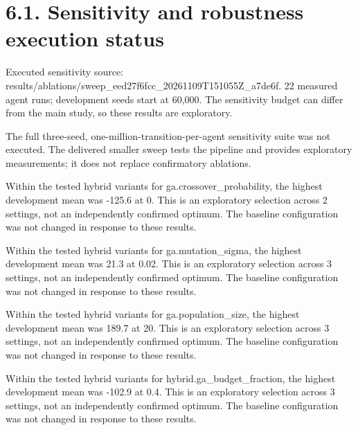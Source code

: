 \documentclass[11pt,a4paper]{article}
\begin{document}
\section*{6.1. Sensitivity and robustness execution status}
Executed sensitivity source: results/ablations/sweep\_eed27f6fcc\_20261109T151055Z\_a7de6f. 22 measured agent runs; development seeds start at 60,000. The sensitivity budget can differ from the main study, so these results are exploratory.

The full three-seed, one-million-transition-per-agent sensitivity suite was not executed. The delivered smaller sweep tests the pipeline and provides exploratory measurements; it does not replace confirmatory ablations.

Within the tested hybrid variants for ga.crossover\_probability, the highest development mean was -125.6 at 0. This is an exploratory selection across 2 settings, not an independently confirmed optimum. The baseline configuration was not changed in response to these results.

Within the tested hybrid variants for ga.mutation\_sigma, the highest development mean was 21.3 at 0.02. This is an exploratory selection across 3 settings, not an independently confirmed optimum. The baseline configuration was not changed in response to these results.

Within the tested hybrid variants for ga.population\_size, the highest development mean was 189.7 at 20. This is an exploratory selection across 3 settings, not an independently confirmed optimum. The baseline configuration was not changed in response to these results.

Within the tested hybrid variants for hybrid.ga\_budget\_fraction, the highest development mean was -102.9 at 0.4. This is an exploratory selection across 3 settings, not an independently confirmed optimum. The baseline configuration was not changed in response to these results.
\end{document}
